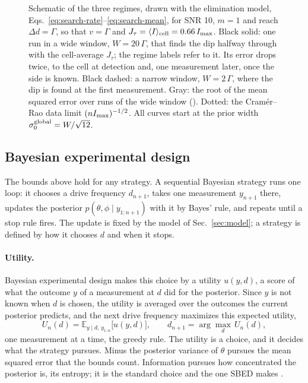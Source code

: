 \begin{figure}[t]
\caption{Schematic of the three regimes, drawn with the elimination model,
Eqs.~\eqref{eq:search-rate}--\eqref{eq:search-mean}, for SNR 10, $m=1$ and reach $\Delta d=\Gamma$, so that
$v=\Gamma$ and $J_\tau=\langle I\rangle_{\rm cell}=0.66\,I_{\rm max}$. Black solid: one run in a wide window,
$W=20\,\Gamma$, that finds the dip halfway through with the cell-average $J_\tau$; the regime
labels refer to it. Its error drops twice, to the cell at detection and, one measurement later, once the side is
known. Black dashed: a narrow window, $W=2\,\Gamma$, where the dip is found at the first measurement. Gray: the root of the mean squared
error over runs of the wide window (). Dotted: the Cram\'er--Rao data limit $(nI_{\rm max})^{-1/2}$. All
curves start at the prior width $\sigma_0^{\rm global}=W/\sqrt{12}$.}
\label{fig:budget}
\end{figure}

\subsection{Bayesian experimental design}
\label{sec:eig}

The bounds above hold for any strategy. A sequential Bayesian strategy runs one loop: it chooses a drive frequency
$d_{n+1}$, takes one measurement $y_{n+1}$ there, updates the posterior $p(\theta,\phi\mid y_{1:n+1})$ with it by
Bayes' rule, and repeats until a stop rule fires. The update is fixed by the model of Sec.~\ref{sec:model}; a strategy is defined by
how it chooses $d$ and when it stops.

\paragraph{Utility.} Bayesian experimental design \cite{lindley1956,chaloner1995bayesian} makes this choice by a
utility $u(y,d)$, a score of what the outcome $y$ of a measurement at $d$ did for the posterior. Since $y$ is not
known when $d$ is chosen, the utility is averaged over the outcomes the current posterior predicts, and the next
drive frequency maximizes this expected utility,
\begin{equation}
  U_n(d)=\mathbb E_{y\mid d,\,y_{1:n}}\big[u(y,d)\big],\qquad d_{n+1}=\arg\max_d\,U_n(d),
  \label{eq:utility}
\end{equation}
one measurement at a time, the greedy rule. The utility is a choice, and it decides what the strategy pursues. Minus
the posterior variance of $\theta$ pursues the mean squared error that the bounds count. Information pursues how
concentrated the posterior is, its entropy; it is the standard choice \cite{lindley1956} and the one SBED makes
\cite{dushenko2020sbed}.

